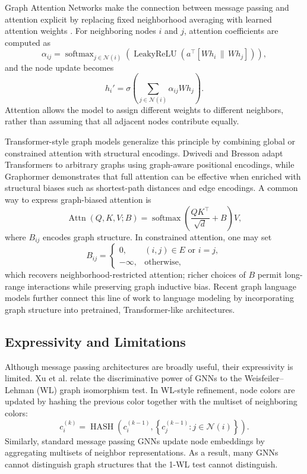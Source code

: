 \documentclass[11pt]{article}
\begin{document}
Graph Attention Networks make the connection between message passing and attention explicit by replacing fixed neighborhood averaging with learned attention weights \cite{velickovic2018graph}. For neighboring nodes $i$ and $j$, attention coefficients are computed as
\[
    \alpha_{ij}
    = \operatorname{softmax}_{j\in\mathcal{N}(i)}
      \left(
      \operatorname{LeakyReLU}\!\left(a^\top[Wh_i\,\|\,Wh_j]\right)
      \right),
\]
and the node update becomes
\[
    h_i'
    = \sigma\!\left(\sum_{j\in\mathcal{N}(i)} \alpha_{ij}Wh_j\right).
\]
Attention allows the model to assign different weights to different neighbors, rather than assuming that all adjacent nodes contribute equally.

Transformer-style graph models generalize this principle by combining global or constrained attention with structural encodings. Dwivedi and Bresson \cite{dwivedi2020generalization} adapt Transformers to arbitrary graphs using graph-aware positional encodings, while Graphormer \cite{ying2021transformers} demonstrates that full attention can be effective when enriched with structural biases such as shortest-path distances and edge encodings. A common way to express graph-biased attention is
\[
    \operatorname{Attn}(Q,K,V;B)
    = \operatorname{softmax}\!\left(\frac{QK^\top}{\sqrt{d}} + B\right)V,
\]
where $B_{ij}$ encodes graph structure. In constrained attention, one may set
\[
    B_{ij}=
    \begin{cases}
    0, & (i,j)\in E \text{ or } i=j,\\
    -\infty, & \text{otherwise},
    \end{cases}
\]
which recovers neighborhood-restricted attention; richer choices of $B$ permit long-range interactions while preserving graph inductive bias. Recent graph language models \cite{plenz-frank-2024-graph} further connect this line of work to language modeling by incorporating graph structure into pretrained, Transformer-like architectures.

\subsection{Expressivity and Limitations}
Although message passing architectures are broadly useful, their expressivity is limited. 
Xu et al. \cite{xu2019powerful} relate the discriminative power of GNNs to the Weisfeiler--Lehman (WL) graph isomorphism test. 
In WL-style refinement, node colors are updated by hashing the previous color together with the multiset of neighboring colors:
\[
    c_i^{(k)}
    = \operatorname{HASH}\!\left(
        c_i^{(k-1)},
        \left\{c_j^{(k-1)} : j\in\mathcal{N}(i)\right\}
      \right).
\]
Similarly, standard message passing GNNs update node embeddings by aggregating multisets of neighbor representations. As a result, many GNNs cannot distinguish graph structures that the 1-WL test cannot distinguish.
\end{document}
